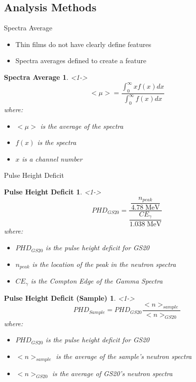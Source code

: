 \subsection{Analysis Methods}
\begin{frame}{Spectra Average}
	\begin{itemize}
		\item Thin films do not have clearly define features
		\item Spectra averages defined to create a feature
	\end{itemize}
	\newtheorem{thm4}{Spectra Average}
	\begin{thm4}<1->
		$$<\mu> = \frac{\int_{0}^{\infty}x f(x)dx}{\int_{0}^{\infty}f(x)dx} $$
		where:
		\begin{itemize}
			\tiny
			\item $<\mu>$ is the average of the spectra
			\item $f(x)$ is the spectra
			\item $x$ is a channel number
		\end{itemize}
	\end{thm4}
\end{frame}
\begin{frame}{Pulse Height Deficit}
	\newtheorem{thm5}{Pulse Height Deficit}
	\begin{thm5}<1->
	\tiny
	$$ PHD_{GS20} = \frac{\dfrac{n_{peak}}{4.78\;\text{MeV}}}{\dfrac{CE_\gamma}{1.038\;\text{MeV}}} $$
		where:
		\begin{itemize}
			\tiny
			\item $PHD_{GS20}$ is the pulse height deficit for GS20
			\item $n_{peak}$ is the location of the peak in the neutron spectra
			\item $CE_\gamma$ is the Compton Edge of the Gamma Spectra
		\end{itemize}
	\end{thm5}
	\newtheorem{thm6}{Pulse Height Deficit (Sample)}
	\begin{thm6}<1->
	\tiny
	$$ PHD_{Sample} = PHD_{GS20} \frac{<n>_{sample}}{<n>_{GS20}} $$
		where:
		\begin{itemize}
			\tiny
			\item $PHD_{GS20}$ is the pulse height deficit for GS20
			\item $<n>_{sample}$ is the average of the sample's neutron spectra
			\item $<n>_{GS20}$ is the average of GS20's neutron spectra
		\end{itemize}
	\end{thm6}
\end{frame}
